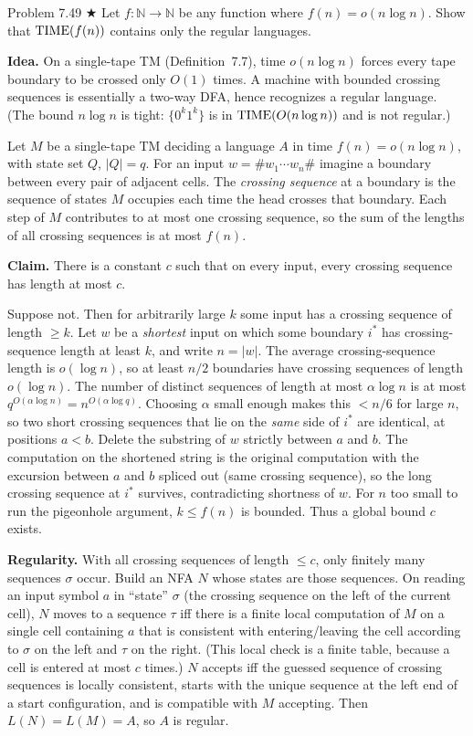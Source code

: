 \begin{question}{Problem 7.49 $\bigstar$}
Let $f:\mathbb{N}\to\mathbb{N}$ be any function where $f(n)=o(n\log n)$. Show that $\mathrm{TIME}(f(n))$ contains only the regular languages.
\end{question}
\begin{soln}
\textbf{Idea.} On a single-tape TM (Definition~7.7), time $o(n\log n)$ forces every tape boundary to be crossed only $O(1)$ times. A machine with bounded crossing sequences is essentially a two-way DFA, hence recognizes a regular language. (The bound $n\log n$ is tight: $\{0^k1^k\}$ is in $\mathrm{TIME}(O(n\log n))$ and is not regular.)

Let $M$ be a single-tape TM deciding a language $A$ in time $f(n)=o(n\log n)$, with state set $Q$, $\lvert Q\rvert=q$. For an input $w=\#w_1\cdots w_n\#$ imagine a boundary between every pair of adjacent cells. The \emph{crossing sequence} at a boundary is the sequence of states $M$ occupies each time the head crosses that boundary. Each step of $M$ contributes to at most one crossing sequence, so the sum of the lengths of all crossing sequences is at most $f(n)$.

\textbf{Claim.} There is a constant $c$ such that on every input, every crossing sequence has length at most $c$.

Suppose not. Then for arbitrarily large $k$ some input has a crossing sequence of length $\ge k$. Let $w$ be a \emph{shortest} input on which some boundary $i^*$ has crossing-sequence length at least $k$, and write $n=\lvert w\rvert$. The average crossing-sequence length is $o(\log n)$, so at least $n/2$ boundaries have crossing sequences of length $o(\log n)$. The number of distinct sequences of length at most $\alpha\log n$ is at most $q^{O(\alpha\log n)}=n^{O(\alpha\log q)}$. Choosing $\alpha$ small enough makes this $<n/6$ for large $n$, so two short crossing sequences that lie on the \emph{same} side of $i^*$ are identical, at positions $a<b$. Delete the substring of $w$ strictly between $a$ and $b$. The computation on the shortened string is the original computation with the excursion between $a$ and $b$ spliced out (same crossing sequence), so the long crossing sequence at $i^*$ survives, contradicting shortness of $w$. For $n$ too small to run the pigeonhole argument, $k\le f(n)$ is bounded. Thus a global bound $c$ exists.

\textbf{Regularity.}
With all crossing sequences of length $\le c$, only finitely many sequences $\sigma$ occur. Build an NFA $N$ whose states are those sequences. On reading an input symbol $a$ in ``state'' $\sigma$ (the crossing sequence on the left of the current cell), $N$ moves to a sequence $\tau$ iff there is a finite local computation of $M$ on a single cell containing $a$ that is consistent with entering/leaving the cell according to $\sigma$ on the left and $\tau$ on the right. (This local check is a finite table, because a cell is entered at most $c$ times.) $N$ accepts iff the guessed sequence of crossing sequences is locally consistent, starts with the unique sequence at the left end of a start configuration, and is compatible with $M$ accepting. Then $L(N)=L(M)=A$, so $A$ is regular.


\end{soln}

